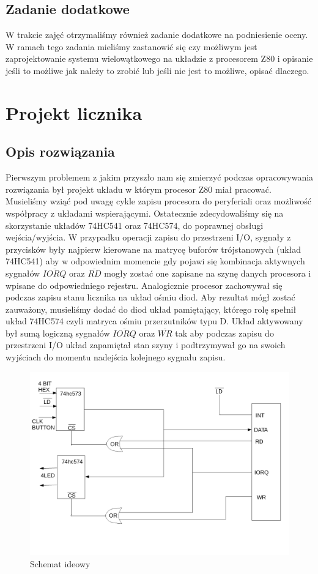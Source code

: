 \documentclass[a4paper,titlepage,11pt,floatssmall]{mwrep}
\begin{document}
\section{Zadanie dodatkowe}
\indent{} W trakcie zajęć otrzymaliśmy również zadanie dodatkowe na podniesienie oceny. W ramach tego zadania mieliśmy zastanowić się czy możliwym jest zaprojektowanie systemu wielowątkowego na układzie z procesorem Z80 i opisanie jeśli to możliwe jak należy to zrobić lub jeśli nie jest to możliwe, opisać dlaczego.


\chapter{Projekt licznika}
\section{Opis rozwiązania}
\indent{} Pierwszym problemem z jakim przyszło nam się zmierzyć podczas opracowywania rozwiązania był projekt układu w którym procesor Z80 miał pracować. Musieliśmy wziąć pod uwagę cykle zapisu procesora do peryferiali oraz możliwość współpracy z układami wspierającymi. Ostatecznie zdecydowaliśmy się na skorzystanie układów 74HC541 oraz 74HC574, do poprawnej obsługi wejścia/wyjścia. W przypadku operacji zapisu do przestrzeni I/O, sygnały z przycisków były najpierw kierowane na matrycę buforów trójstanowych (układ 74HC541) aby w odpowiednim momencie gdy pojawi się kombinacja aktywnych sygnałów $\overline{IORQ}$ oraz $\overline{RD}$ mogły zostać one zapisane na szynę danych procesora i wpisane do odpowiedniego rejestru. \indent{} Analogicznie procesor zachowywał się podczas zapisu stanu licznika na układ ośmiu diod. Aby rezultat mógł zostać zauważony, musieliśmy dodać do diod układ pamiętający, którego rolę spełnił układ 74HC574 czyli matryca ośmiu przerzutników typu D. Układ aktywowany był sumą logiczną sygnałów $\overline{IORQ}$ oraz $\overline{WR}$ tak aby podczas zapisu do przestrzeni I/O układ zapamiętał stan szyny i podtrzymywał go na swoich wyjściach do momentu nadejścia kolejnego sygnału zapisu. 

\begin{figure}[th]
\centering
\includegraphics[width=\textwidth]{ideowy}
\caption{Schemat ideowy}
\end{figure}
\end{document}
